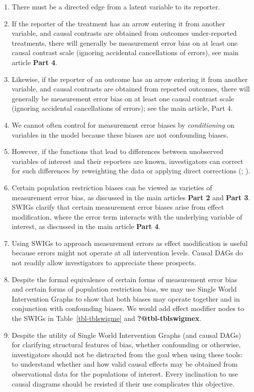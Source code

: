 \documentclass[
  single column]{article}
\providecommand{\tightlist}{%
  \setlength{\itemsep}{0pt}\setlength{\parskip}{0pt}}\usepackage{longtable,booktabs,array}
\begin{document}
\begin{enumerate}
\def\labelenumi{\arabic{enumi}.}
\tightlist
\item
  There must be a directed edge from a latent variable to its reporter.
\item
  If the reporter of the treatment has an arrow entering it from another
  variable, and causal contrasts are obtained from outcomes
  under-reported treatments, there will generally be measurement error
  bias on at least one causal contrast scale (ignoring accidental
  cancellations of errors), see main article \textbf{Part 4}.
\item
  Likewise, if the reporter of an outcome has an arrow entering it from
  another variable, and causal contrasts are obtained from reported
  outcomes, there will generally be measurement error bias on at least
  one causal contrast scale (ignoring accidental cancellations of
  errors); see the main article, Part 4.
\item
  We cannot often control for measurement error biases by
  \emph{conditioning} on variables in the model because these biases are
  not confounding biases.
\item
  However, if the functions that lead to differences between unobserved
  variables of interest and their reporters are known, investigators can
  correct for such differences by reweighting the data or applying
  direct corrections (; ).
\item
  Certain population restriction biases can be viewed as varieties of
  measurement error bias, as discussed in the main articles \textbf{Part
  2} and \textbf{Part 3}. SWIGs clarify that certain measurement error
  biases arise from effect modification, where the error term interacts
  with the underlying variable of interest, as discussed in the main
  article \textbf{Part 4}.
\item
  Using SWIGs to approach measurement errors as effect modification is
  useful because errors might not operate at all intervention levels.
  Causal DAGs do not readily allow investigators to appreciate these
  prospects.
\item
  Despite the formal equivalence of certain forms of measurement error
  bias and certain forms of population restriction bias, we may use
  Single World Intervention Graphs to show that both biases may operate
  together and in conjunction with confounding biases. We would add
  effect modifier nodes to the SWIGs in Table~\ref{tbl-tblswigme} and
  \textbf{?@tbl-tblswigmex}.
\item
  Despite the utility of Single World Intervention Graphs (and causal
  DAGs) for clarifying structural features of bias, whether confounding
  or otherwise, investigators should not be distracted from the goal
  when using these tools: to understand whether and how valid causal
  effects may be obtained from observational data for the populations of
  interest. Every inclination to use causal diagrams should be resisted
  if their use complicates this objective.
\end{enumerate}
\end{document}
